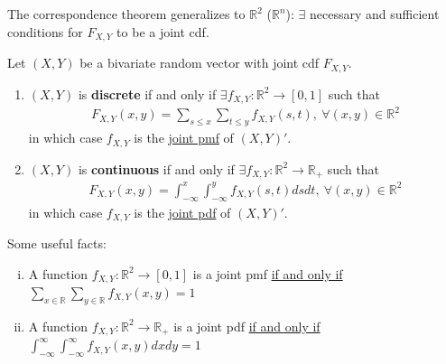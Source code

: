 \documentclass[11pt]{elegantbook}
\begin{document}
\begin{proposition}
    The correspondence theorem generalizes to $\mathbb{R}^2$ ($\mathbb{R}^n$): $\exists$ necessary and sufficient conditions for $F_{X,Y}$ to be a joint cdf.
\end{proposition}


\begin{definition}
    \normalfont
    Let $(X,Y)$ be a bivariate random vector with joint cdf $F_{X,Y}$.
    \begin{enumerate}[$\circ$]
        \item $(X,Y)$ is \textbf{discrete} if and only if $\exists f_{X,Y}: \mathbb{R}^2 \rightarrow [0,1]$ such that
        \begin{equation}
            \begin{aligned}
                F_{X,Y}(x,y)=\sum_{s\leq x}\sum_{t\leq y}f_{X,Y}(s,t),\ \forall (x,y)\in \mathbb{R}^2
            \end{aligned}
            \nonumber
        \end{equation}
        in which case $f_{X,Y}$ is the \underline{joint pmf} of $(X,Y)'$.
        \item $(X,Y)$ is \textbf{continuous} if and only if $\exists f_{X,Y}: \mathbb{R}^2 \rightarrow \mathbb{R}_+$ such that
        \begin{equation}
            \begin{aligned}
                F_{X,Y}(x,y)=\int_{-\infty}^x\int_{-\infty}^yf_{X,Y}(s,t) ds dt,\ \forall (x,y)\in \mathbb{R}^2
            \end{aligned}
            \nonumber
        \end{equation}
        in which case $f_{X,Y}$ is the \underline{joint pdf} of $(X,Y)'$.
    \end{enumerate}
\end{definition}

\begin{proposition}
    Some useful facts:
    \begin{enumerate}[(i).]
        \item A function $f_{X,Y}: \mathbb{R}^2 \rightarrow [0,1]$ is a joint pmf \underline{if and only if} $\sum_{x\in \mathbb{R}}\sum_{y\in \mathbb{R}}f_{X,Y}(x,y)=1$
        \item A function $f_{X,Y}: \mathbb{R}^2 \rightarrow \mathbb{R}_+$ is a joint pdf \underline{if and only if} $\int_{-\infty}^\infty\int_{-\infty}^\infty f_{X,Y}(x,y) dx dy=1$
    \end{enumerate}
\end{proposition}
\end{document}
